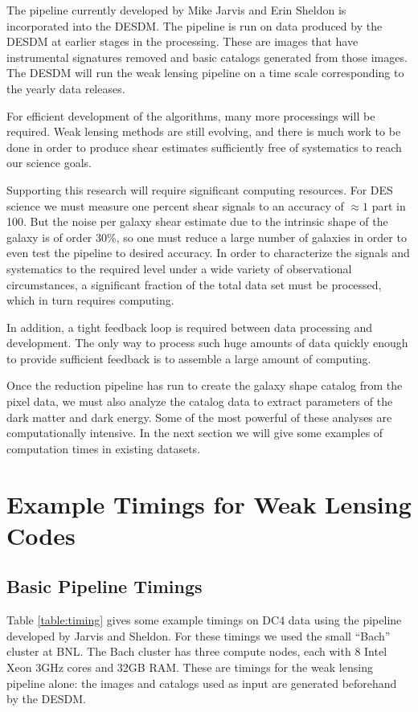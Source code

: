\documentclass[12pt]{article}
\begin{document}
The pipeline currently developed by Mike Jarvis and Erin Sheldon is
incorporated into the DESDM.  The pipeline is run on data produced by the DESDM
at earlier stages in the processing.  These are images that have instrumental
signatures removed and basic catalogs generated from those images.  The DESDM
will run the weak lensing pipeline on a time scale corresponding to the yearly
data releases. 

For efficient development of the algorithms, many more processings will be
required.  Weak lensing methods are still evolving, and there is much
work to be done in order to produce shear estimates sufficiently free of
systematics to reach our science goals.

Supporting this research will require significant computing resources. For DES
science we must measure one percent shear signals to an accuracy of $\approx 1$
part in 100.  But the noise per galaxy shear estimate due to the intrinsic
shape of the galaxy is of order 30\%, so one must reduce a large number of
galaxies in order to even test the pipeline to desired accuracy.  In order to
characterize the signals and systematics to the required level under a wide
variety of observational circumstances, a significant fraction of the total
data set must be processed, which in turn requires computing.

In addition, a tight feedback loop is required between data processing and
development.  The only way to process such huge amounts of data quickly enough
to provide sufficient feedback is to assemble a large amount of computing.

Once the reduction pipeline has run to create the galaxy shape catalog from the
pixel data, we must also analyze the catalog data to extract parameters of the
dark matter and dark energy.   Some of the most powerful of these analyses are
computationally intensive.  In the next section we will give some examples of
computation times in existing datasets.



\section{Example Timings for Weak Lensing Codes}

\subsection{Basic Pipeline Timings}

Table \ref{table:timing} gives some example timings on DC4 data using the
pipeline developed by Jarvis and Sheldon.  For these timings we used the small
``Bach'' cluster at BNL.  The Bach cluster has three compute nodes, each with 8
Intel Xeon 3GHz cores and 32GB RAM.  These are timings for the weak lensing
pipeline alone: the images and catalogs used as input are generated beforehand
by the DESDM.
\end{document}
